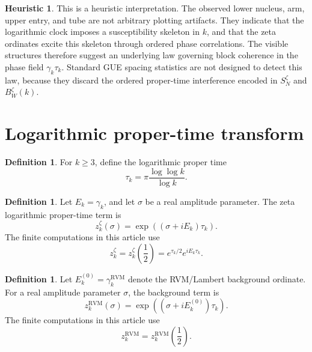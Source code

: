 \documentclass[11pt]{amsart}
\numberwithin{equation}{section}
\theoremstyle{plain}
\theoremstyle{definition}
\newtheorem{definition}[theorem]{Definition}
\newtheorem{heuristic}[theorem]{Heuristic}
\theoremstyle{remark}
\newcommand{\RVM}{\mathrm{RVM}}
\begin{document}
\begin{heuristic}
\label{heur:law_of_block_coherence}
This is a heuristic interpretation.  The observed lower nucleus, arm, upper entry, and tube are not arbitrary plotting artifacts.  They indicate that the logarithmic clock imposes a susceptibility skeleton in \(k\), and that the zeta ordinates excite this skeleton through ordered phase correlations.  The visible structures therefore suggest an underlying law governing block coherence in the phase field \(\gamma_k\tau_k\).  Standard GUE spacing statistics are not designed to detect this law, because they discard the ordered proper-time interference encoded in \(S_N^\zeta\) and \(B_W^\zeta(k)\).
\end{heuristic}

\section{Logarithmic proper-time transform}
\label{sec:logarithmic_proper_time_transform}

\begin{definition}
\label{def:logarithmic_proper_time}
For \(k\geq 3\), define the logarithmic proper time
\begin{equation}
\tau_k
=
\pi\frac{\log\log k}{\log k}.
\label{eq:def_logarithmic_proper_time}
\end{equation}
\end{definition}

\begin{definition}
\label{def:zeta_transform}
Let \(E_k=\gamma_k\), and let \(\sigma\) be a real amplitude parameter.  The zeta logarithmic proper-time term is
\begin{equation}
z_k^\zeta(\sigma)
=
\exp\left(
\left(\sigma+iE_k\right)\tau_k
\right).
\label{eq:def_zeta_transform_sigma}
\end{equation}
The finite computations in this article use
\begin{equation}
z_k^\zeta
=
z_k^\zeta\left(\frac{1}{2}\right)
=
e^{\tau_k/2}e^{iE_k\tau_k}.
\label{eq:def_zeta_transform}
\end{equation}
\end{definition}

\begin{definition}
\label{def:rvm_transform}
Let \(E_k^{(0)}=\gamma_k^{\RVM}\) denote the RVM/Lambert background ordinate.  For a real amplitude parameter \(\sigma\), the background term is
\begin{equation}
z_k^{\RVM}(\sigma)
=
\exp\left(
\left(\sigma+iE_k^{(0)}\right)\tau_k
\right).
\label{eq:def_rvm_transform_sigma}
\end{equation}
The finite computations in this article use
\begin{equation}
z_k^{\RVM}
=
z_k^{\RVM}\left(\frac{1}{2}\right).
\label{eq:def_rvm_transform}
\end{equation}
\end{definition}
\end{document}
